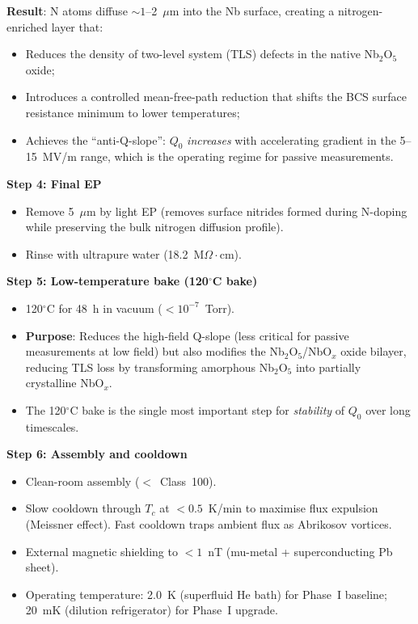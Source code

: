 \documentclass[11pt]{article}
\theoremstyle{definition}
\theoremstyle{remark}
\begin{document}
\begin{tcolorbox}[colback=green!5!white, colframe=green!50!black,
  title=\textbf{RECOMMENDED Nb PREPARATION PROTOCOL FOR PHASE~I}]
\textbf{Result}: N atoms diffuse $\sim 1$--2~$\mu$m into the Nb
surface, creating a nitrogen-enriched layer that:
\begin{itemize}[nosep]
  \item Reduces the density of two-level system (TLS) defects in the
    native Nb$_2$O$_5$ oxide;
  \item Introduces a controlled mean-free-path reduction that shifts
    the BCS surface resistance minimum to lower temperatures;
  \item Achieves the ``anti-Q-slope'': $Q_0$ \emph{increases} with
    accelerating gradient in the 5--15~MV/m range, which is the
    operating regime for passive measurements.
\end{itemize}

\textbf{Step 4: Final EP}
\begin{itemize}[nosep]
  \item Remove 5~$\mu$m by light EP (removes surface nitrides formed
    during N-doping while preserving the bulk nitrogen diffusion profile).
  \item Rinse with ultrapure water (18.2~M$\Omega\cdot$cm).
\end{itemize}

\textbf{Step 5: Low-temperature bake (120$^\circ$C bake)}
\begin{itemize}[nosep]
  \item 120$^\circ$C for 48~h in vacuum ($<10^{-7}$~Torr).
  \item \textbf{Purpose}: Reduces the high-field Q-slope (less critical
    for passive measurements at low field) but also modifies the
    Nb$_2$O$_5$/NbO$_x$ oxide bilayer, reducing TLS loss by
    transforming amorphous Nb$_2$O$_5$ into partially crystalline NbO$_x$.
  \item The 120$^\circ$C bake is the single most important step for
    \emph{stability} of $Q_0$ over long timescales.
\end{itemize}

\textbf{Step 6: Assembly and cooldown}
\begin{itemize}[nosep]
  \item Clean-room assembly ($<$~Class~100).
  \item Slow cooldown through $T_c$ at $<0.5$~K/min to maximise
    flux expulsion (Meissner effect). Fast cooldown traps ambient
    flux as Abrikosov vortices.
  \item External magnetic shielding to $<1$~nT
    (mu-metal + superconducting Pb sheet).
  \item Operating temperature: 2.0~K (superfluid He bath) for Phase~I
    baseline; 20~mK (dilution refrigerator) for Phase~I upgrade.
\end{itemize}
\end{tcolorbox}
\end{document}
